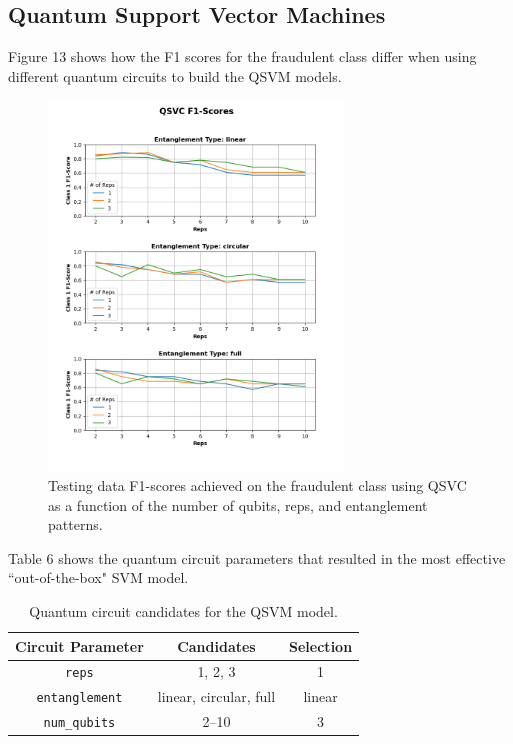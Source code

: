 \documentclass[11pt, oneside]{article}   	%
\begin{document}
\subsection{Quantum Support Vector Machines}

Figure 13 shows how the F1 scores for the fraudulent class differ when using different quantum circuits to build the QSVM models.

\begin{figure}[h!]
    \centering
    \includegraphics[width=0.7\textwidth]{figures/fig_13.png}
    \captionsetup{font=small} 
    \caption{Testing data F1-scores achieved on the fraudulent class using QSVC as a function of the number of qubits, reps, and entanglement patterns.}
    \label{fig13}
\end{figure}

Table 6 shows the quantum circuit parameters that resulted in the most effective ``out-of-the-box" SVM model. 

\begin{table}[h!]
	\centering
	\begin{tabular}{|c|c|c|}
		\hline
		\textbf{Circuit Parameter} & \textbf{Candidates} & \textbf{Selection} \\ \hline
		\texttt{reps} & 1, 2, 3 & 1 \\ \hline
		\texttt{entanglement} & linear, circular, full & linear \\ \hline
		\texttt{num\_qubits} & 2--10 & 3\\ \hline
	\end{tabular}
	\caption{Quantum circuit candidates for the QSVM model.}
	\label{tab6}
\end{table}
\end{document}

